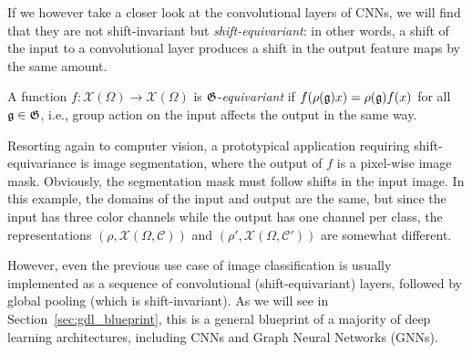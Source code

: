 If we however take a closer look at the convolutional layers of CNNs, we will find that they are not shift-invariant but {\em shift-equivariant}: in other words, a shift of the input to a convolutional layer produces a shift in the output feature maps by the same amount. 

\begin{tcolorbox}[width=\linewidth,
                  boxsep=0pt,
                  left=7.5pt,
                  right=7.5pt,
                  top=7.5pt,
                  bottom=7.5pt,
                  arc=0pt,
                  boxrule=0pt,toprule=0pt,
                  colback=boxgray,
                  ]%
    A function $f: \mathcal{X}(\Omega) \rightarrow \mathcal{X}(\Omega)$ is ${\mathfrak{G}}$-{\em equivariant} if 
    $f(\rho({\mathfrak{g}})x) = \rho({\mathfrak{g}}) f(x)$  for all ${\mathfrak{g}} \in {\mathfrak{G}}$, i.e., group action on the input affects the output in the same way. 
\end{tcolorbox}




Resorting again to computer vision, a prototypical application requiring shift-equivariance is image segmentation, where the output of $f$ is a pixel-wise image mask. 
%
Obviously, the segmentation mask must follow shifts in the input image.  
In this example, the domains of the input and output are the same, but since the input has three color channels while the output has one channel per class, the representations $(\rho, \mathcal{X}(\Omega, \mathcal{C}))$ and $(\rho', \mathcal{X}(\Omega, \mathcal{C}'))$ are somewhat different.


However, even the previous use case of image classification is usually implemented as a sequence of convolutional (shift-equivariant) layers, followed by global pooling (which is shift-invariant). 
%
As we will see in Section~\ref{sec:gdl_blueprint}, this is a general blueprint of a majority of deep learning architectures, including CNNs and Graph Neural Networks (GNNs). 


